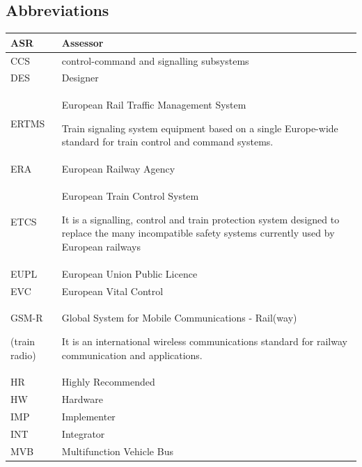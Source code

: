 \documentclass{template/openetcs_article}
\begin{document}
\subsection{Abbreviations}
\begin{flushleft}
\tabletail{}
\tablelasttail{}
\begin{supertabular}{|m{2cm}|m{12cm}|}
\hline
ASR &
Assessor\\\hline
CCS &
control-command and signalling subsystems  \\\hline
DES &
Designer\\\hline
ERTMS &
European Rail Traffic Management System

Train signaling system equipment based on a single Europe-wide standard for train control and command systems.\\\hline
ERA &
European Railway Agency\\\hline
ETCS &
European Train Control System

It is a signalling, control and train protection system designed to replace the many incompatible safety systems currently used by European railways\\\hline
EUPL &
European Union Public Licence\\\hline
EVC &
European Vital Control\\\hline
GSM-R

(train radio) &
Global System for Mobile Communications - Rail(way)

It is an international wireless communications standard for railway communication and applications.\\\hline
HR &
Highly Recommended\\\hline
HW &
Hardware\\\hline
IMP &
Implementer\\\hline
INT &
Integrator\\\hline
MVB &
Multifunction Vehicle Bus


\end{supertabular}
\end{flushleft}
\end{document}
